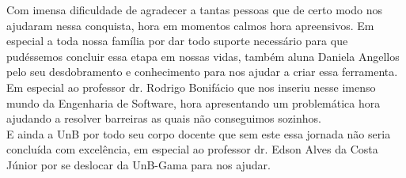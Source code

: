 Com imensa dificuldade de agradecer a tantas pessoas que de certo modo nos ajudaram nessa conquista, hora em momentos calmos hora apreensivos. Em especial a toda nossa família por dar todo suporte necessário para que pudéssemos concluir essa etapa em nossas vidas, também aluna Daniela Angellos pelo seu desdobramento e conhecimento para nos ajudar a criar essa ferramenta.\\
Em especial ao professor dr. Rodrigo Bonifácio que nos inseriu nesse imenso mundo da Engenharia de Software, hora apresentando um problemática hora ajudando a resolver barreiras as quais não conseguimos sozinhos.\\
E ainda a UnB por todo seu corpo docente que sem este essa jornada não seria concluída com excelência, em especial ao professor dr. Edson Alves da Costa Júnior por se deslocar da UnB-Gama para nos ajudar.\\

